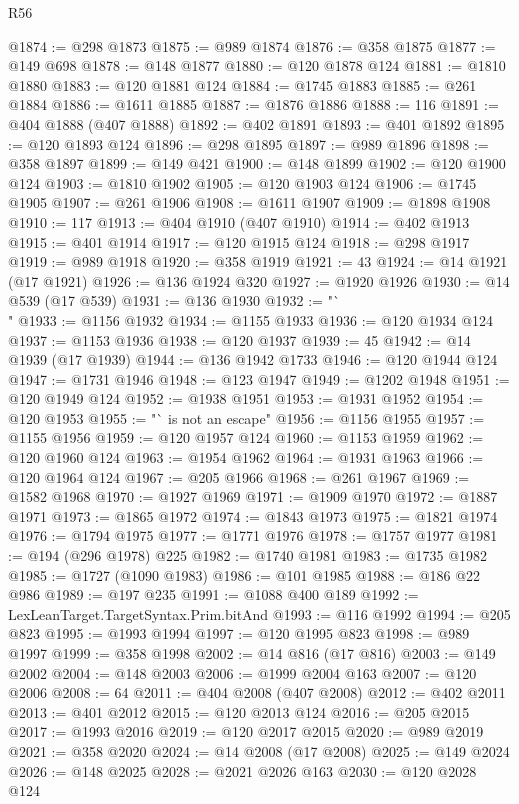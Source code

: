 \begin{lexlean}{R56}
\begin{coremodule}
@1874 := @298 @1873
@1875 := @989 @1874
@1876 := @358 @1875
@1877 := @149 @698
@1878 := @148 @1877
@1880 := @120 @1878 @124
@1881 := @1810 @1880
@1883 := @120 @1881 @124
@1884 := @1745 @1883
@1885 := @261 @1884
@1886 := @1611 @1885
@1887 := @1876 @1886
@1888 := 116
@1891 := @404 @1888 (@407 @1888)
@1892 := @402 @1891
@1893 := @401 @1892
@1895 := @120 @1893 @124
@1896 := @298 @1895
@1897 := @989 @1896
@1898 := @358 @1897
@1899 := @149 @421
@1900 := @148 @1899
@1902 := @120 @1900 @124
@1903 := @1810 @1902
@1905 := @120 @1903 @124
@1906 := @1745 @1905
@1907 := @261 @1906
@1908 := @1611 @1907
@1909 := @1898 @1908
@1910 := 117
@1913 := @404 @1910 (@407 @1910)
@1914 := @402 @1913
@1915 := @401 @1914
@1917 := @120 @1915 @124
@1918 := @298 @1917
@1919 := @989 @1918
@1920 := @358 @1919
@1921 := 43
@1924 := @14 @1921 (@17 @1921)
@1926 := @136 @1924 @320
@1927 := @1920 @1926
@1930 := @14 @539 (@17 @539)
@1931 := @136 @1930
@1932 := "`\\"
@1933 := @1156 @1932
@1934 := @1155 @1933
@1936 := @120 @1934 @124
@1937 := @1153 @1936
@1938 := @120 @1937
@1939 := 45
@1942 := @14 @1939 (@17 @1939)
@1944 := @136 @1942 @1733
@1946 := @120 @1944 @124
@1947 := @1731 @1946
@1948 := @123 @1947
@1949 := @1202 @1948
@1951 := @120 @1949 @124
@1952 := @1938 @1951
@1953 := @1931 @1952
@1954 := @120 @1953
@1955 := "` is not an escape"
@1956 := @1156 @1955
@1957 := @1155 @1956
@1959 := @120 @1957 @124
@1960 := @1153 @1959
@1962 := @120 @1960 @124
@1963 := @1954 @1962
@1964 := @1931 @1963
@1966 := @120 @1964 @124
@1967 := @205 @1966
@1968 := @261 @1967
@1969 := @1582 @1968
@1970 := @1927 @1969
@1971 := @1909 @1970
@1972 := @1887 @1971
@1973 := @1865 @1972
@1974 := @1843 @1973
@1975 := @1821 @1974
@1976 := @1794 @1975
@1977 := @1771 @1976
@1978 := @1757 @1977
@1981 := @194 (@296 @1978) @225
@1982 := @1740 @1981
@1983 := @1735 @1982
@1985 := @1727 (@1090 @1983)
@1986 := @101 @1985
@1988 := @186 @22 @986
@1989 := @197 @235
@1991 := @1088 @400 @189
@1992 := LexLeanTarget.TargetSyntax.Prim.bitAnd
@1993 := @116 @1992
@1994 := @205 @823
@1995 := @1993 @1994
@1997 := @120 @1995 @823
@1998 := @989 @1997
@1999 := @358 @1998
@2002 := @14 @816 (@17 @816)
@2003 := @149 @2002
@2004 := @148 @2003
@2006 := @1999 @2004 @163
@2007 := @120 @2006
@2008 := 64
@2011 := @404 @2008 (@407 @2008)
@2012 := @402 @2011
@2013 := @401 @2012
@2015 := @120 @2013 @124
@2016 := @205 @2015
@2017 := @1993 @2016
@2019 := @120 @2017 @2015
@2020 := @989 @2019
@2021 := @358 @2020
@2024 := @14 @2008 (@17 @2008)
@2025 := @149 @2024
@2026 := @148 @2025
@2028 := @2021 @2026 @163
@2030 := @120 @2028 @124

\end{coremodule}
\end{lexlean}
